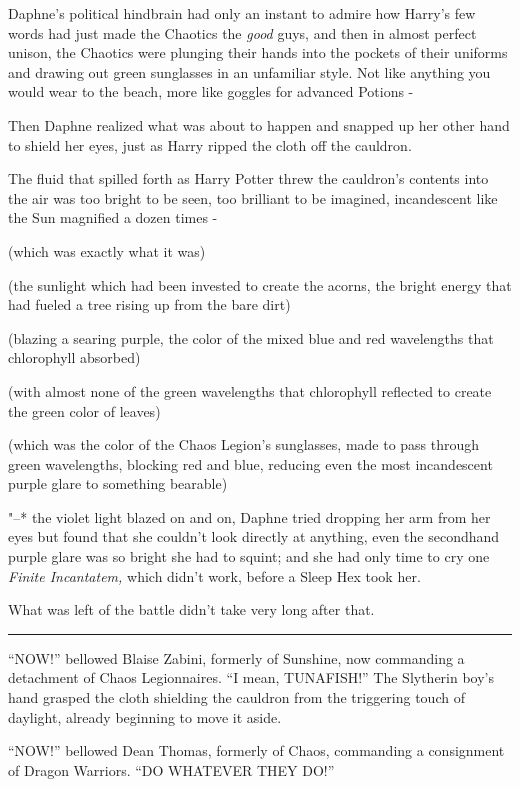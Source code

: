 Daphne's political hindbrain had only an instant to admire how Harry's
few words had just made the Chaotics the \emph{good} guys, and then in
almost perfect unison, the Chaotics were plunging their hands into the
pockets of their uniforms and drawing out green sunglasses in an
unfamiliar style. Not like anything you would wear to the beach, more
like goggles for advanced Potions -

Then Daphne realized what was about to happen and snapped up her other
hand to shield her eyes, just as Harry ripped the cloth off the
cauldron.

The fluid that spilled forth as Harry Potter threw the cauldron's
contents into the air was too bright to be seen, too brilliant to be
imagined, incandescent like the Sun magnified a dozen times -

(which was exactly what it was)

(the sunlight which had been invested to create the acorns, the bright
energy that had fueled a tree rising up from the bare dirt)

(blazing a searing purple, the color of the mixed blue and red
wavelengths that chlorophyll absorbed)

(with almost none of the green wavelengths that chlorophyll reflected to
create the green color of leaves)

(which was the color of the Chaos Legion's sunglasses, made to pass
through green wavelengths, blocking red and blue, reducing even the most
incandescent purple glare to something bearable)

"--* the violet light blazed on and on, Daphne tried dropping her arm from
her eyes but found that she couldn't look directly at anything, even the
secondhand purple glare was so bright she had to squint; and she had
only time to cry one \emph{Finite Incantatem,} which didn't work, before
a Sleep Hex took her.

What was left of the battle didn't take very long after that.

\begin{center}\rule{3in}{0.4pt}\end{center}

``NOW!'' bellowed Blaise Zabini, formerly of Sunshine, now commanding a
detachment of Chaos Legionnaires. ``I mean, TUNAFISH!'' The Slytherin
boy's hand grasped the cloth shielding the cauldron from the triggering
touch of daylight, already beginning to move it aside.

``NOW!'' bellowed Dean Thomas, formerly of Chaos, commanding a
consignment of Dragon Warriors. ``DO WHATEVER THEY DO!''

